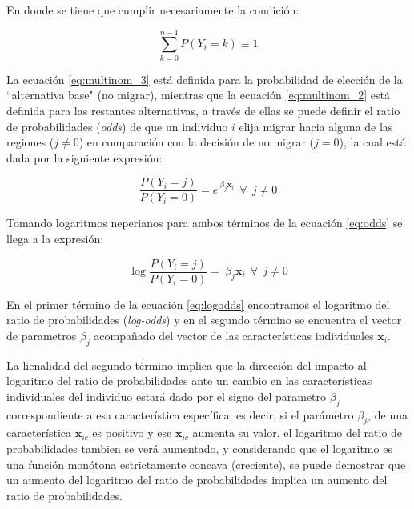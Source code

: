 \documentclass[12pt,a4paper]{article}
\begin{document}
En donde se tiene que cumplir necesariamente la condición:
\begin {center}
\begin{equation}\label{eq:multinom_4}
\sum_{k=0}^{n-1}P{(Y_{i}=k)}\equiv1
\end{equation}
\end {center}

La ecuación \ref{eq:multinom_3} está definida para la probabilidad de elección de la ``alternativa base" (no migrar), mientras que la ecuación \ref{eq:multinom_2} está definida para las restantes alternativas, a través de ellas se puede definir el ratio de probabilidades (\textit{odds}) de que un individuo $i$ elija migrar hacia alguna de las regiones ($j\neq0$) en comparación con la decisión de no migrar ($j=0$), la cual está dada por la siguiente expresión:
\begin{center}
\begin{equation}\label{eq:odds}
\frac{P{(Y_{i}=j)}}{P{(Y_{i}=0)}}=e^{\ \beta_{j} \textbf{x}_{i}} \ \ \forall \ \ j\neq0
\end{equation}
\end {center}
Tomando logaritmos neperianos para ambos términos de la ecuación \ref{eq:odds} se llega a la expresión:
\begin{center}
\begin{equation}\label{eq:logodds}
\log\frac{P{(Y_{i}=j)}}{P{(Y_{i}=0)}}=\ \beta_{j} \textbf{x}_{i} \ \ \forall \ \ j\neq0
\end{equation}
\end {center}

En el primer término de la ecuación \ref{eq:logodds} encontramos el logaritmo del ratio de probabilidades (\textit{log-odds}) y en el segundo término se encuentra el vector de parametros $\beta_{j}$ acompañado del vector de las características individuales $\textbf{x}_{i}$. 

La lienalidad del segundo término implica que la dirección del impacto al logaritmo del ratio de probabilidades ante  un cambio en las características individuales del individuo estará dado por el signo del parametro $\beta_{j}$ correspondiente a esa característica específica, es decir, si el parámetro  $\beta_{jc}$ de una característica $\textbf{x}_{ic}$ es positivo y ese $\textbf{x}_{ic}$  aumenta su valor, el logaritmo del ratio de probabilidades tambien se verá aumentado, y considerando que el logaritmo es una función monótona estrictamente concava (creciente), se puede demostrar que un aumento del logaritmo del ratio de probabilidades implica un aumento del ratio de probabilidades.
\end{document}
